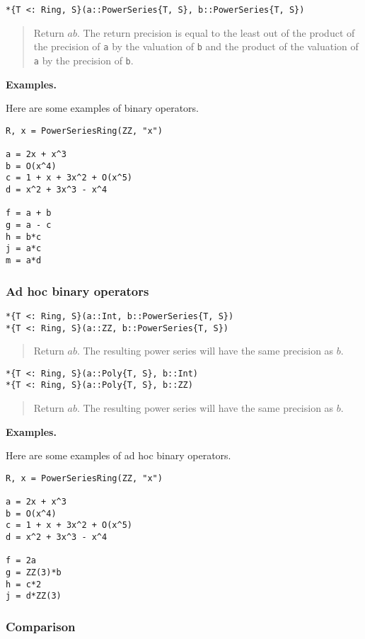 \documentclass[a4paper,10pt]{article}
\newcommand{\code}{\lstinline}
\newcommand{\desc}[1]{\vspace{-3mm}\begin{quote}#1\end{quote}}
\begin{document}
{{\begin{lstlisting}
*{T <: Ring, S}(a::PowerSeries{T, S}, b::PowerSeries{T, S})
\end{lstlisting}

\desc{Return $ab$. The return precision is equal to the least out of the
product of the precision of \code{a} by the valuation of \code{b} and
the product of the valuation of \code{a} by the precision of \code{b}.}

\textbf{Examples.}

Here are some examples of binary operators.

\begin{lstlisting}
R, x = PowerSeriesRing(ZZ, "x")

a = 2x + x^3
b = O(x^4)
c = 1 + x + 3x^2 + O(x^5)
d = x^2 + 3x^3 - x^4

f = a + b
g = a - c
h = b*c
j = a*c
m = a*d
\end{lstlisting}

\subsubsection{Ad hoc binary operators}

\begin{lstlisting}
*{T <: Ring, S}(a::Int, b::PowerSeries{T, S})
*{T <: Ring, S}(a::ZZ, b::PowerSeries{T, S})
\end{lstlisting}

\desc{Return $ab$. The resulting power series will have the same precision as
$b$.}

\begin{lstlisting}
*{T <: Ring, S}(a::Poly{T, S}, b::Int)
*{T <: Ring, S}(a::Poly{T, S}, b::ZZ)
\end{lstlisting}

\desc{Return $ab$. The resulting power series will have the same precision as
$b$.}

\textbf{Examples.}

Here are some examples of ad hoc binary operators.

\begin{lstlisting}
R, x = PowerSeriesRing(ZZ, "x")

a = 2x + x^3
b = O(x^4)
c = 1 + x + 3x^2 + O(x^5)
d = x^2 + 3x^3 - x^4

f = 2a
g = ZZ(3)*b
h = c*2
j = d*ZZ(3)
\end{lstlisting}

\subsubsection{Comparison}

}}
\end{document}
